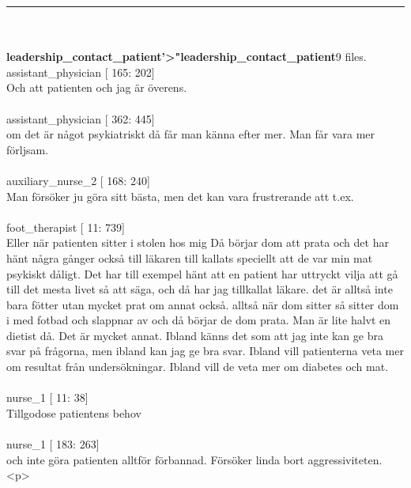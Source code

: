 \documentclass[12pt,a4paper,oneside]{article}
\begin{document}
\hrule

\ \\\ \\{\bf leadership\_contact\_patient'>"leadership\_contact\_patient}9 files.
 assistant\_physician [ 165: 202]\\ 
Och att patienten och jag {\"a}r {\"o}verens. %
\ \\\ \\
 assistant\_physician [ 362: 445]\\ 
om det {\"a}r n{\aa}got psykiatriskt d{\aa} f{\aa}r man k{\"a}nna efter mer. Man f{\aa}r vara mer f{\"o}rljsam. %
\ \\\ \\
 auxiliary\_nurse\_2 [ 168: 240]\\ 
Man f{\"o}rs{\"o}ker ju g{\"o}ra sitt b{\"a}sta, men det kan vara frustrerande att t.ex. %
\ \\\ \\
 foot\_therapist [  11: 739]\\ 
Eller n{\"a}r patienten sitter i stolen hos mig D{\aa} b{\"o}rjar dom att prata och det har h{\"a}nt n{\aa}gra g{\aa}nger ocks{\aa} till l{\"a}karen till kallats speciellt att de var min mat psykiskt d{\aa}ligt. Det har till exempel h{\"a}nt att en patient har uttryckt vilja att g{\aa} till det mesta livet s{\aa} att s{\"a}ga, och d{\aa} har jag tillkallat l{\"a}kare. det {\"a}r allts{\aa} inte bara f{\"o}tter utan mycket prat om annat ocks{\aa}. allts{\aa} n{\"a}r dom sitter s{\aa} sitter dom i med fotbad och slappnar av och d{\aa} b{\"o}rjar de dom prata. Man {\"a}r lite halvt en dietist d{\aa}. Det {\"a}r mycket annat. Ibland k{\"a}nns det som att jag inte kan ge bra svar p{\aa} fr{\aa}gorna, men ibland kan jag ge bra svar. Ibland vill patienterna veta mer om resultat fr{\aa}n unders{\"o}kningar. Ibland vill de veta mer om diabetes och mat.  %
\ \\\ \\
 nurse\_1 [  11:  38]\\ 
Tillgodose patientens behov %
\ \\\ \\
 nurse\_1 [ 183: 263]\\ 
och inte g{\"o}ra patienten alltf{\"o}r f{\"o}rbannad. F{\"o}rs{\"o}ker linda bort aggressiviteten.<p> %
\ \\\ \\
\end{document}
